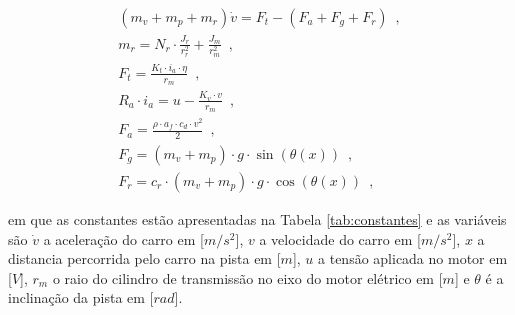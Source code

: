 \begin{subequations}
	\label{eq:modelo_1}
    \begin{align}
        (m_v + m_p + m_r) \dot v = F_t - (F_a + F_g + F_r) \enspace,\\
        m_r =  N_r \cdot \frac{J_r}{r_r^2}  + \frac{J_m}{r_m^2} \enspace, \\    
        F_{t} =  \frac{K_t \cdot i_a \cdot \eta}{r_m} \enspace,\\
		R_{a} \cdot i_{a} = u - \frac{K_{v} \cdot v}{r_m} \enspace, \\
        F_{a} = \frac{\rho \cdot a_f \cdot c_d \cdot v^2}{2} \enspace,\\
        F_{g} = (m_v + m_p) \cdot g \cdot \sin(\theta(x)) \enspace,\\
        F_{r}  = c_{r} \cdot (m_v + m_p) \cdot g \cdot \cos(\theta(x)) \enspace,
	\end{align}
\end{subequations}

em que as constantes estão apresentadas na Tabela \ref{tab:constantes} e as variáveis são $\dot v$ a aceleração 
do carro em [$m/s^2$], $v$ a velocidade do carro em [$m/s^2$], $x$ a distancia percorrida pelo carro na pista em [$m$], 
$u$ a tensão aplicada no motor em [$V$], $r_m$ o raio do cilindro de transmissão no eixo do motor elétrico em [$m$] e $\theta$ é a inclinação da pista em [$rad$].

